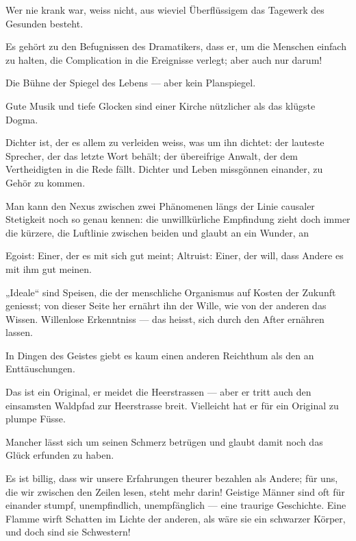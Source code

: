 Wer nie krank war, weiss nicht, aus wieviel Überflüssigem das Tagewerk des Gesunden besteht.
\par

Es gehört zu den Befugnissen des Dramatikers, dass er, um die Menschen einfach zu halten, die Complication in die Ereignisse verlegt; aber auch nur darum!
\par

Die Bühne der Spiegel des Lebens — aber kein Planspiegel.
\par

Gute Musik und tiefe Glocken sind einer Kirche nützlicher als das klügste Dogma.
\par

Dichter ist, der es allem zu verleiden weiss, was um ihn dichtet: der lauteste Sprecher, der das letzte Wort behält; der übereifrige Anwalt, der dem Vertheidigten in die Rede fällt. Dichter und Leben missgönnen einander, zu Gehör zu kommen.
\par

Man kann den Nexus zwischen zwei Phänomenen längs der Linie causaler Stetigkeit noch so genau kennen: die unwillkürliche Empfindung zieht doch immer die kürzere, die Luftlinie zwischen beiden und glaubt an ein Wunder, an 
\par

Egoist: Einer, der es mit sich gut meint; Altruist: Einer, der will, dass Andere es mit ihm gut meinen.
\par

„Ideale“ sind Speisen, die der menschliche Organismus auf Kosten der Zukunft geniesst; von dieser Seite her ernährt ihn der Wille, wie von der anderen das Wissen. Willenlose Erkenntniss — das heisst, sich durch den After ernähren lassen.
\par

In Dingen des Geistes giebt es kaum einen anderen Reichthum als den an Enttäuschungen.
\par

Das ist ein Original, er meidet die Heerstrassen — aber er tritt auch den einsamsten Waldpfad zur Heerstrasse breit. Vielleicht hat er für ein Original zu plumpe Füsse.
\par

Mancher lässt sich um seinen Schmerz betrügen und glaubt damit noch das Glück erfunden zu haben.
\par

Es ist billig, dass wir unsere Erfahrungen theurer bezahlen als Andere; für uns, die wir zwischen den Zeilen lesen, steht mehr darin! Geistige Männer sind oft für einander stumpf, unempfindlich, unempfänglich — eine traurige Geschichte. Eine Flamme wirft Schatten im Lichte der anderen, als wäre sie ein schwarzer Körper, und doch sind sie Schwestern!
\par

